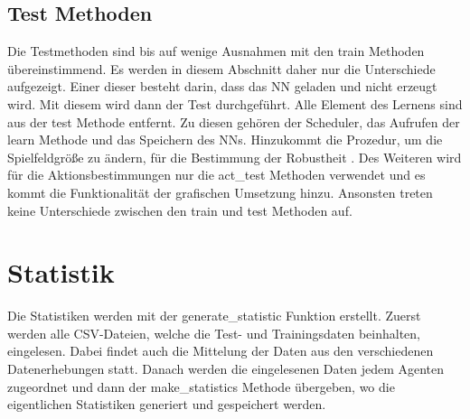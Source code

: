 \subsection{Test Methoden} \label{sec:Implementierung_test_Methode}
Die Testmethoden sind bis auf wenige Ausnahmen mit den train Methoden übereinstimmend. Es werden in diesem Abschnitt daher nur die Unterschiede aufgezeigt. Einer dieser besteht darin, dass das NN geladen und nicht erzeugt wird. Mit diesem wird dann der Test durchgeführt. Alle Element des Lernens sind aus der test Methode entfernt. Zu diesen gehören der Scheduler, das Aufrufen der learn Methode und das Speichern des NNs.
Hinzukommt die Prozedur, um die Spielfeldgröße zu ändern, für die Bestimmung der Robustheit .
Des Weiteren wird für die Aktionsbestimmungen nur die act\_test Methoden verwendet und es kommt die Funktionalität der grafischen Umsetzung hinzu.
Ansonsten treten keine Unterschiede zwischen den train und test Methoden auf.

\section{Statistik} \label{sec:Implementierung_Statistiken}
Die Statistiken werden mit der generate\_statistic Funktion erstellt.
Zuerst werden alle CSV-Dateien, welche die Test- und Trainingsdaten beinhalten, eingelesen. Dabei findet auch die Mittelung der Daten aus den verschiedenen Datenerhebungen  statt.
Danach werden die eingelesenen Daten jedem Agenten zugeordnet und dann der make\_statistics Methode übergeben, wo die eigentlichen Statistiken generiert und gespeichert werden.